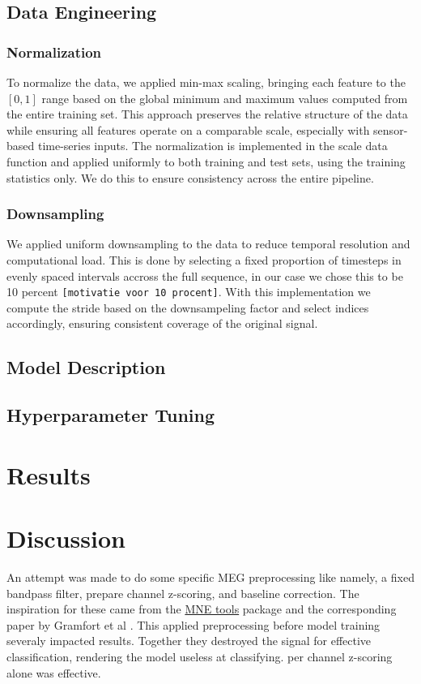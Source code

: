 \documentclass[conference]{IEEEtran}
\begin{document}
\subsection{Data Engineering}

\subsubsection{Normalization}
To normalize the data, we applied min-max scaling, bringing each feature to the $[0,1]$ range based on the global minimum and maximum values computed from the entire training set.
 This approach preserves the relative structure of the data while ensuring all features operate on a comparable scale, especially with sensor-based time-series inputs.
The normalization is implemented in the scale data function and applied uniformly to both training and test sets, using the training statistics only. We do this to ensure consistency across the entire pipeline.

\subsubsection{Downsampling}
We applied uniform downsampling to the data to reduce temporal resolution and computational load. 
This is done by selecting a fixed proportion of timesteps in evenly spaced intervals accross the full sequence, in our case we chose this to be 10 percent \texttt{[motivatie voor 10 procent]}.
 With this implementation we compute the stride based on the downsampeling factor and select indices accordingly, ensuring consistent coverage of the original signal. 

\subsection{Model Description}


\subsection{Hyperparameter Tuning}

\section{Results}

\section{Discussion}
An attempt was made to do some specific MEG preprocessing like namely, a fixed bandpass filter, prepare
channel z-scoring, and baseline correction. The inspiration for these came from the 
\href{https://mne.tools/stable/index.html}{MNE tools} package and the corresponding paper by Gramfort et al 
\cite{gramfort2013meg}. This applied preprocessing before model training severaly impacted results.
Together they destroyed the signal for effective classification, rendering the model useless at 
classifying. per channel z-scoring alone was effective.
\end{document}
